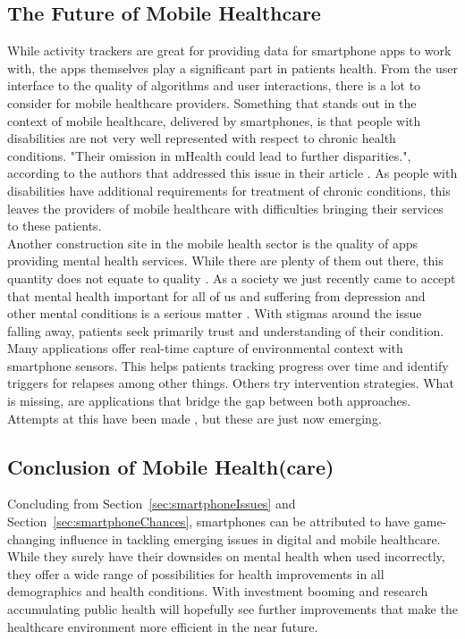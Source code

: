 \subsection{The Future of Mobile Healthcare}
While activity trackers are great for providing data for smartphone apps to work with, the apps themselves play a significant part in patients health. From the user interface to the quality of algorithms and user interactions, there is a lot to consider for mobile healthcare providers. Something that stands out in the context of mobile healthcare, delivered by smartphones, is that people with disabilities are not very well represented with respect to chronic health conditions. "Their omission in mHealth could lead to further disparities.", according to the authors that addressed this issue in their article \cite{jones2018mobile}. As people with disabilities have additional requirements for treatment of chronic conditions, this leaves the providers of mobile healthcare with difficulties bringing their services to these patients. \\
Another construction site in the mobile health sector is the quality of apps providing mental health services. While there are plenty of them out there, this quantity does not equate to quality \cite{torous2017needed}. As a society we just recently came to accept that mental health important for all of us and suffering from depression and other mental conditions is a serious matter \cite{bharadwaj2017mental}. With stigmas around the issue falling away, patients seek primarily trust and understanding of their condition. Many applications offer real-time capture of environmental context with smartphone sensors. This helps patients tracking progress over time and identify triggers for relapses among other things. Others try intervention strategies. What is missing, are applications that bridge the gap between both approaches. Attempts at this have been made \cite{torous2019creating}, but these are just now emerging.
\subsection{Conclusion of Mobile Health(care)}
Concluding from Section~\ref{sec:smartphoneIssues} and Section~\ref{sec:smartphoneChances}, smartphones can be attributed to have game-changing influence in tackling emerging issues in digital and mobile healthcare. While they surely have their downsides on mental health when used incorrectly, they offer a wide range of possibilities for health improvements in all demographics and health conditions. With investment booming \cite{safavi2019top} and research accumulating \cite{firth2016ecological} public health will hopefully see further improvements that make the healthcare environment more efficient in the near future.
